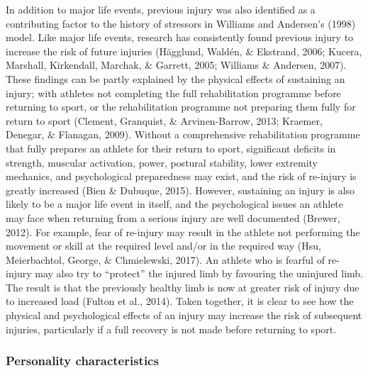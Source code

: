 \documentclass[man,floatsintext]{apa6}
\begin{document}
In addition to major life events, previous injury was also identified as a contributing factor to the history of stressors in Williams and Andersen's (1998) model.
Like major life events, research has consistently found previous injury to increase the risk of future injuries (Hägglund, Waldén, \& Ekstrand, 2006; Kucera, Marshall, Kirkendall, Marchak, \& Garrett, 2005; Williams \& Andersen, 2007).
These findings can be partly explained by the physical effects of sustaining an injury; with athletes not completing the full rehabilitation programme before returning to sport, or the rehabilitation programme not preparing them fully for return to sport (Clement, Granquist, \& Arvinen-Barrow, 2013; Kraemer, Denegar, \& Flanagan, 2009).
Without a comprehensive rehabilitation programme that fully prepares an athlete for their return to sport, significant deficits in strength, muscular activation, power, postural stability, lower extremity mechanics, and psychological preparedness may exist, and the risk of re-injury is greatly increased (Bien \& Dubuque, 2015).
However, sustaining an injury is also likely to be a major life event in itself, and the psychological issues an athlete may face when returning from a serious injury are well documented (Brewer, 2012).
For example, fear of re-injury may result in the athlete not performing the movement or skill at the required level and/or in the required way (Hsu, Meierbachtol, George, \& Chmielewski, 2017).
An athlete who is fearful of re-injury may also try to \enquote{protect} the injured limb by favouring the uninjured limb.
The result is that the previously healthy limb is now at greater risk of injury due to increased load (Fulton et al., 2014).
Taken together, it is clear to see how the physical and psychological effects of an injury may increase the risk of subsequent injuries, particularly if a full recovery is not made before returning to sport.

\hypertarget{personality-characteristics}{%
\subsubsection{Personality characteristics}\label{personality-characteristics}}
\end{document}
